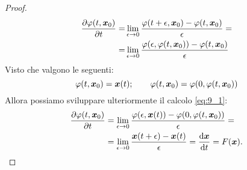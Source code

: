 \noindent
\begin{proof}
    \begin{equation}
    \begin{aligned}
	\frac{\partial \varphi (t, \boldsymbol{x}_0)}{\partial t} =&
	\lim_{\epsilon \to 0}  \frac{\varphi (t+\epsilon, \boldsymbol{x}_0)- \varphi (t, \boldsymbol{x}_0)}{\epsilon}=\\
	=& \lim_{\epsilon \to 0} \frac{\varphi (\epsilon, \varphi (t, \boldsymbol{x}_0))- \varphi (t, \boldsymbol{x}_0)}{\epsilon}
	\label{eq:9_1}
    \end{aligned}
    \end{equation}
Visto che valgono le seguenti:
\[
    \varphi (t,\boldsymbol{x}_0)=\boldsymbol{x} (t); \qquad \varphi (t, \boldsymbol{x}_0)=\varphi (0, \varphi (t, \boldsymbol{x}_0))
\] 
Allora possiamo sviluppare ulteriormente il calcolo \ref{eq:9_1}:
\[\begin{aligned}
    \frac{\partial \varphi (t, \boldsymbol{x}_0)}{\partial t} &= 
    \lim_{\epsilon \to 0} \frac{\varphi (\epsilon, \boldsymbol{x}(t)) - \varphi (0, \varphi (t, \boldsymbol{x}_0))}{\epsilon} = \\
							&= \lim_{\epsilon \to 0} \frac{\boldsymbol{x}(t + \epsilon) - \boldsymbol{x} (t)}{\epsilon} =
							\frac{\text{d} \boldsymbol{x}}{\text{d} t} =F(\boldsymbol{x})
.\end{aligned}\]
\end{proof}
\noindent
